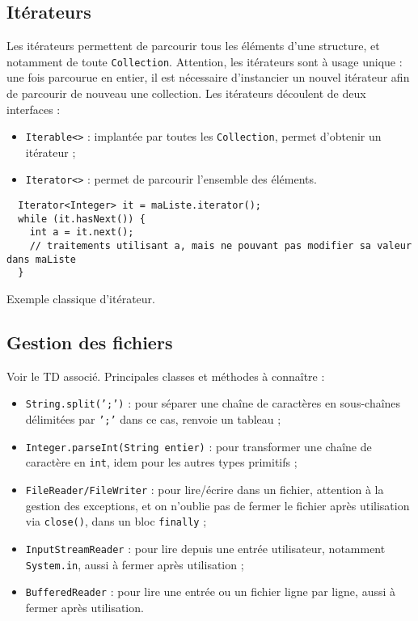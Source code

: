 \documentclass[10pt]{article}
\begin{document}
\subsection{Itérateurs}

Les itérateurs permettent de parcourir tous les éléments d'une structure, et notamment de toute \texttt{Collection}.
Attention, les itérateurs sont à usage unique : une fois parcourue en entier, il est nécessaire d'instancier un nouvel itérateur
afin de parcourir de nouveau une collection. Les itérateurs découlent de deux interfaces :
\begin{itemize}
\item \texttt{Iterable<>} : implantée par toutes les \texttt{Collection}, permet d'obtenir un itérateur ;
\item \texttt{Iterator<>} : permet de parcourir l'ensemble des éléments.
\end{itemize}

\begin{listing}[h!]
\begin{verbatim}
  Iterator<Integer> it = maListe.iterator();
  while (it.hasNext()) {
    int a = it.next();
    // traitements utilisant a, mais ne pouvant pas modifier sa valeur dans maListe
  }
\end{verbatim}
\caption{Exemple classique d'itérateur.
\label{lst.iterator}}
\end{listing}


\subsection{Gestion des fichiers}

Voir le TD associé. Principales classes et méthodes à connaître :
\begin{itemize}
\item \texttt{String.split(';')} : pour séparer une chaîne de caractères en sous-chaînes délimitées par \texttt{';'} dans ce cas, renvoie un tableau ;
\item \texttt{Integer.parseInt(String entier)} : pour transformer une chaîne de caractère en \texttt{int}, idem pour les autres types primitifs ;
\item \texttt{FileReader/FileWriter} : pour lire/écrire dans un fichier, attention à la gestion des exceptions, et on n'oublie pas de fermer le fichier après utilisation via \texttt{close()}, dans un bloc \texttt{finally} ;
\item \texttt{InputStreamReader} : pour lire depuis une entrée utilisateur, notamment \texttt{System.in}, aussi à fermer après utilisation ;
\item \texttt{BufferedReader} : pour lire une entrée ou un fichier ligne par ligne, aussi à fermer après utilisation.
\end{itemize}
\end{document}
